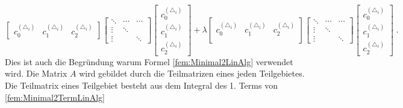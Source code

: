 \begin{equation}
\begin{bmatrix}
c_0^{(\triangle_i)} &  c_1^{(\triangle_i)} &  c_2^{(\triangle_i)}  
\end{bmatrix}
\begin{bmatrix}
\ddots & \cdots &  \cdots    \\
\vdots & \ddots &   \\
\vdots &  & \ddots
\end{bmatrix}
\begin{bmatrix}
c_0^{(\triangle_i)}  \\
c_1^{(\triangle_i)} \\
c_2^{(\triangle_i)}
\end{bmatrix}
+
\lambda
\begin{bmatrix}
c_0^{(\triangle_i)} &  c_1^{(\triangle_i)} &  c_2^{(\triangle_i)}    \\   
\end{bmatrix}
\begin{bmatrix}
\ddots & \cdots &  \cdots    \\
\vdots & \ddots &   \\
\vdots &  & \ddots
\end{bmatrix}
\begin{bmatrix}
c_0^{(\triangle_i)}  \\
c_1^{(\triangle_i)} \\
c_2^{(\triangle_i)}
\end{bmatrix} \; .
	\label{fem:MatrixKoeffizient}
\end{equation}
Dies ist auch die Begründung warum Formel \eqref{fem:Minimal2LinAlg} verwendet wird.
Die Matrix $A$ wird gebildet durch die Teilmatrizen eines jeden Teilgebietes. Die Teilmatrix eines Teilgebiet besteht  aus dem Integral des 1. Terms von \eqref{fem:Minimal2TermLinAlg} 

